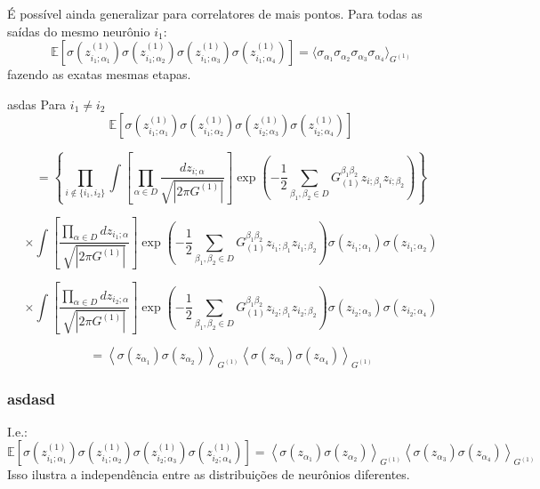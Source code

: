 \documentclass{beamer}
\begin{document}
\begin{frame}
    É possível ainda generalizar para correlatores de mais pontos. Para todas as saídas do mesmo neurônio $i_1$:
    $$
    \mathbb{E} \left[ \sigma( z^{(1)}_{i_1;\alpha_1} ) \sigma( z^{(1)}_{i_1;\alpha_2})\sigma( z^{(1)}_{i_1;\alpha_3}) \sigma( z^{(1)}_{i_1;\alpha_4}) \right] = \langle \sigma_{\alpha_1} \sigma_{\alpha_2}\sigma_{\alpha_3}\sigma_{\alpha_4} \rangle_{G^{(1)}}
    $$
    fazendo as exatas mesmas etapas.
\end{frame}

\begin{frame}{asdas}
    Para $i_1\neq i_2$
    \tiny
    $$
    \mathbb{E} \left[
    \sigma\left( z^{(1)}_{i_1;\alpha_1} \right)
    \sigma\left( z^{(1)}_{i_1;\alpha_2} \right)
    \sigma\left( z^{(1)}_{i_2;\alpha_3} \right)
    \sigma\left( z^{(1)}_{i_2;\alpha_4} \right)
    \right]
    $$

    $$
    = \left\{ 
    \prod_{i \notin \{i_1, i_2\}} 
    \displaystyle \int \left[ \prod_{\alpha \in D} \frac{dz_{i;\alpha}}{\sqrt{|2\pi G^{(1)}|}} \right]
    \exp\left( -\frac{1}{2} \sum_{\beta_1, \beta_2 \in D} G_{(1)}^{\beta_1 \beta_2} z_{i;\beta_1} z_{i;\beta_2} \right)
    \right\}
    $$

    $$
    \times \displaystyle \int \left[ \frac{\prod_{\alpha \in D} dz_{i_1;\alpha}}{\sqrt{|2\pi G^{(1)}|}} \right]
    \exp\left( -\frac{1}{2} \sum_{\beta_1, \beta_2 \in D} G_{(1)}^{\beta_1 \beta_2} z_{i_1;\beta_1} z_{i_1;\beta_2} \right)
    \sigma(z_{i_1;\alpha_1}) \sigma(z_{i_1;\alpha_2})
    $$

    $$
    \times \displaystyle \int \left[ \frac{\prod_{\alpha \in D} dz_{i_2;\alpha}}{\sqrt{|2\pi G^{(1)}|}} \right]
    \exp\left( -\frac{1}{2} \sum_{\beta_1, \beta_2 \in D} G_{(1)}^{\beta_1 \beta_2} z_{i_2;\beta_1} z_{i_2;\beta_2} \right)
    \sigma(z_{i_2;\alpha_3}) \sigma(z_{i_2;\alpha_4})
    $$

    $$
    = \left\langle \sigma(z_{\alpha_1}) \sigma(z_{\alpha_2}) \right\rangle_{G^{(1)}}
    \left\langle \sigma(z_{\alpha_3}) \sigma(z_{\alpha_4}) \right\rangle_{G^{(1)}}
    $$


\end{frame}

\begin{frame}
    \frametitle{asdasd}

    I.e.:
    \tiny
    $$
    \mathbb{E} \left[
    \sigma\left( z^{(1)}_{i_1;\alpha_1} \right)
    \sigma\left( z^{(1)}_{i_1;\alpha_2} \right)
    \sigma\left( z^{(1)}_{i_2;\alpha_3} \right)
    \sigma\left( z^{(1)}_{i_2;\alpha_4} \right)
    \right]
    = \left\langle \sigma(z_{\alpha_1}) \sigma(z_{\alpha_2}) \right\rangle_{G^{(1)}}
    \left\langle \sigma(z_{\alpha_3}) \sigma(z_{\alpha_4}) \right\rangle_{G^{(1)}}
    $$
    \normalsize
    Isso ilustra a independência entre as distribuições de neurônios diferentes.

\end{frame}
\end{document}

